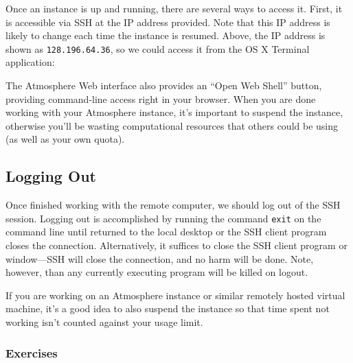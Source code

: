 \documentclass[
]{memoir}
\begin{document}
Once an instance is up and running, there are several ways to access it. First, it is accessible via SSH at the IP address provided. Note that this IP address is likely to change each time the instance is resumed. Above, the IP address is shown as \texttt{128.196.64.36}, so we could access it from the OS X Terminal application:

The Atmosphere Web interface also provides an \enquote{Open Web Shell} button, providing command-line access right in your browser. When you are done working with your Atmosphere instance, it's important to suspend the instance, otherwise you'll be wasting computational resources that others could be using (as well as your own quota).

\hypertarget{logging-out}{%
\subsection*{Logging Out}\label{logging-out}}

Once finished working with the remote computer, we should log out of the SSH session. Logging out is accomplished by running the command \texttt{exit} on the command line until returned to the local desktop or the SSH client program closes the connection. Alternatively, it suffices to close the SSH client program or window---SSH will close the connection, and no harm will be done. Note, however, than any currently executing program will be killed on logout.

If you are working on an Atmosphere instance or similar remotely hosted virtual machine, it's a good idea to also suspend the instance so that time spent not working isn't counted against your usage limit.

\hypertarget{exercises}{%
\subsubsection*{Exercises}\label{exercises}}
\end{document}

